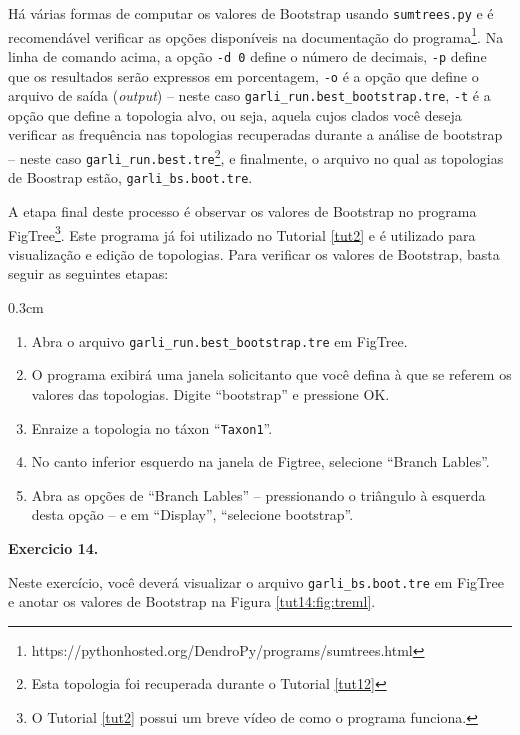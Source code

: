 \begin{refsection}
Há várias formas de computar os valores de Bootstrap usando \texttt{sumtrees.py} e é recomendável verificar as opções disponíveis na documentação do programa\footnote{https://pythonhosted.org/DendroPy/programs/sumtrees.html}. Na linha de comando acima, a opção \texttt{-d 0} define o número de decimais, \texttt{-p} define que os resultados serão expressos em porcentagem, \texttt{-o} é a opção que define o arquivo de saída (\textit{output}) -- neste caso  \texttt{garli\_run.best\_bootstrap.tre}, \texttt{-t} é a opção que define a topologia alvo, ou seja, aquela cujos clados você deseja verificar as frequência nas topologias recuperadas durante a análise de bootstrap -- neste caso \texttt{garli\_run.best.tre}\footnote{Esta topologia foi recuperada durante o Tutorial \ref{tut12}}, e finalmente, o arquivo no qual as topologias de Boostrap estão, \texttt{garli\_bs.boot.tre}.

A etapa final deste processo é observar os valores de Bootstrap no programa FigTree\footnote{ O Tutorial \ref{tut2} possui um breve vídeo de como o programa funciona.}. Este programa já foi utilizado no Tutorial \ref{tut2} e é utilizado para visualização e edição de topologias. Para verificar os valores de Bootstrap, basta seguir as seguintes etapas:

\begin {myindentpar}{0.3cm}
\begin{enumerate}[1.]

	\item{Abra o arquivo \texttt{garli\_run.best\_bootstrap.tre} em FigTree.}
	\item{O programa exibirá uma janela solicitanto que você defina à que se referem os valores das topologias. Digite ``bootstrap'' e pressione OK.}
	\item{Enraize a topologia no táxon ``\texttt{Taxon1}''.}
	\item{No canto inferior esquerdo na janela de Figtree, selecione ``Branch Lables''.}
	\item{Abra as opções de ``Branch Lables'' -- pressionando o triângulo à esquerda desta opção -- e em ``Display'', ``selecione bootstrap''.}

\end{enumerate}
\end{myindentpar}


\begin{blackBlock}{\textbf{Exercicio 14.}}\label{tut14:ex:14.3}

Neste exercício, você deverá visualizar o arquivo \texttt{garli\_bs.boot.tre} em FigTree e anotar os valores de Bootstrap na Figura \ref{tut14:fig:treml}.


\end{blackBlock}
\end{refsection}
